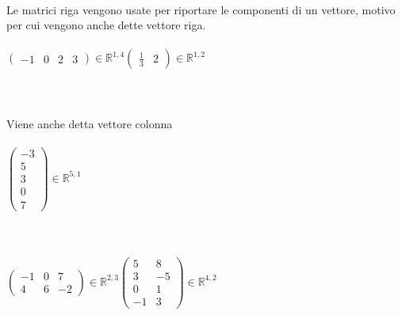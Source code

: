 \documentclass{report}
\begin{document}
\\
Le matrici riga vengono usate per riportare le componenti di un vettore, motivo per cui vengono anche dette vettore riga.
\\
\\
$ 
\begin{pmatrix}
-1 & 0 & 2 & 3
\end{pmatrix} \in \mathbb{R}^{1,4} \begin{pmatrix}
  \frac{1}{3} & 2
\end{pmatrix} \in \mathbb{R}^{1,2}
$
\\
\\
\\
\\
Viene anche detta vettore colonna
\\
\\
$ 
\begin{pmatrix}
  -3 \\
  5 \\
  3 \\
  0 \\
  7
\end{pmatrix} \in \mathbb{R}^{5,1}
$
\\
\\
\\
\\
$  

\begin{pmatrix}
  -1 & 0 & 7 \\
  4 & 6 & -2 
\end{pmatrix} \in \mathbb{R}^{2,3}\begin{pmatrix}
  5 & 8 \\
  3 & -5 \\
  0 & 1 \\
  -1 & 3 
\end{pmatrix} \in \mathbb{R}^{4,2}

$
\\
\\
\end{document}
